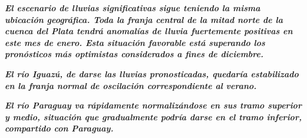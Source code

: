 \emph{\textbf{El escenario de lluvias significativas sigue teniendo la
misma ubicación geográfica. Toda la franja central de la mitad norte de
la cuenca del Plata tendrá anomalías de lluvia fuertemente positivas en
este mes de enero. Esta situación favorable está superando los
pronósticos más optimistas considerados a fines de diciembre.}}

\emph{\textbf{El río Iguazú, de darse las lluvias pronosticadas,
quedaría estabilizado en la franja normal de oscilación correspondiente
al verano.}}

\emph{\textbf{El río Paraguay va rápidamente normalizándose en sus tramo
superior y medio, situación que gradualmente podría darse en el tramo
inferior, compartido con Paraguay.}}
